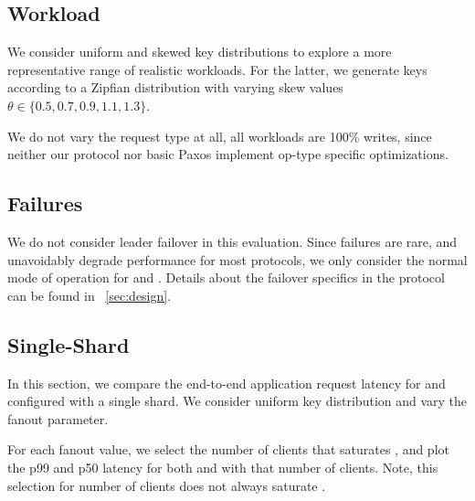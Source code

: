 

\subsection{Workload}
We consider uniform and skewed key distributions to explore a more representative range of realistic workloads. For the latter, we generate keys according to a Zipfian distribution with varying skew values $\theta \in \{0.5, 0.7, 0.9, 1.1, 1.3\}$. 

We do not vary the request type at all, all workloads are 100\% writes, since neither our protocol nor basic Paxos implement op-type specific optimizations. 

\subsection{Failures}
We do not consider leader failover in this evaluation. Since failures are rare, and unavoidably degrade performance for most protocols, we only consider the normal mode of operation for \protocol and \mpaxos. Details about the failover specifics in the protocol can be found in ~\ref{sec:design}.

\subsection{Single-Shard}
In this section, we compare the end-to-end application request latency for \system and \mpaxos configured with a single shard. We consider uniform key distribution and vary the fanout parameter.

For each fanout value, we select the number of clients that saturates \system, and plot the p99 and p50 latency for both \system and \mpaxos with that number of clients. Note, this selection for number of clients does not always saturate \mpaxos.

